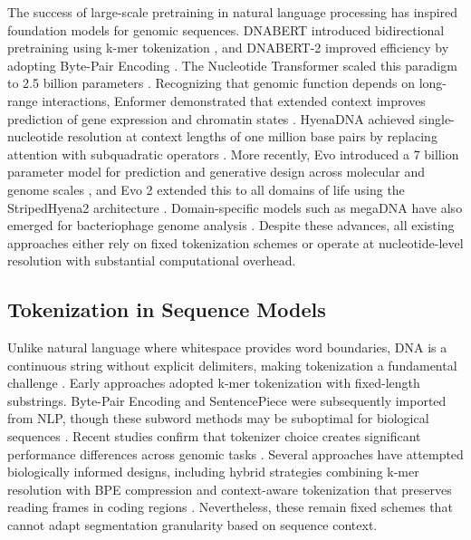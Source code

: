 \documentclass{article}
\theoremstyle{plain}
\theoremstyle{definition}
\theoremstyle{remark}
\begin{document}
The success of large-scale pretraining in natural language processing has inspired foundation models for genomic sequences. DNABERT introduced bidirectional pretraining using k-mer tokenization \citep{Ji2021}, and DNABERT-2 improved efficiency by adopting Byte-Pair Encoding \citep{Zhou2023}. The Nucleotide Transformer scaled this paradigm to 2.5 billion parameters \citep{DallaTorre2024}. Recognizing that genomic function depends on long-range interactions, Enformer demonstrated that extended context improves prediction of gene expression and chromatin states \citep{Avsec2021}. HyenaDNA achieved single-nucleotide resolution at context lengths of one million base pairs by replacing attention with subquadratic operators \citep{nguyen2023hyenadnalongrangegenomicsequence}. More recently, Evo introduced a 7 billion parameter model for prediction and generative design across molecular and genome scales \citep{Nguyen2024}, and Evo 2 extended this to all domains of life using the StripedHyena2 architecture \citep{Brixi2025.02.18.638918}. Domain-specific models such as megaDNA have also emerged for bacteriophage genome analysis \citep{megadna}. Despite these advances, all existing approaches either rely on fixed tokenization schemes or operate at nucleotide-level resolution with substantial computational overhead.

\subsection{Tokenization in Sequence Models}

Unlike natural language where whitespace provides word boundaries, DNA is a continuous string without explicit delimiters, making tokenization a fundamental challenge \citep{Ji2021, Lindsey2025}. Early approaches adopted k-mer tokenization with fixed-length substrings. Byte-Pair Encoding \citep{sennrich2016neuralmachinetranslationrare} and SentencePiece \citep{kudo2018sentencepiecesimplelanguageindependent} were subsequently imported from NLP, though these subword methods may be suboptimal for biological sequences \citep{bostrom2020bytepairencodingsuboptimal}. Recent studies confirm that tokenizer choice creates significant performance differences across genomic tasks \citep{Lindsey2025}. Several approaches have attempted biologically informed designs, including hybrid strategies combining k-mer resolution with BPE compression \citep{sapkota2025hybridtokenizationstrategydna} and context-aware tokenization that preserves reading frames in coding regions \citep{CodonTransformer}. Nevertheless, these remain fixed schemes that cannot adapt segmentation granularity based on sequence context.
\end{document}
